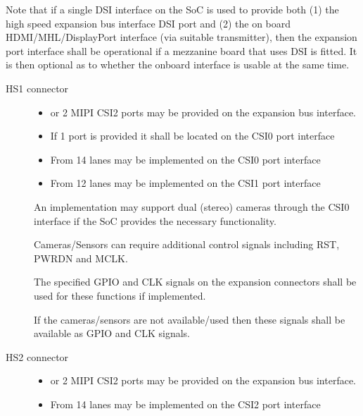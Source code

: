 \documentclass[a4paper,10pt,oneside,english]{sphinxmanual}
\begin{document}
\sphinxAtStartPar
Note that if a single DSI interface on the SoC is used to provide both (1) the high speed expansion bus interface DSI port and (2) the on board HDMI/MHL/DisplayPort interface (via suitable transmitter), then the expansion port interface shall be operational if a mezzanine board that uses DSI is fitted. It is then optional as to whether the on\sphinxhyphen{}board interface is usable at the same time.

\sphinxAtStartPar
{}
\begin{description}
\item[{HS1 connector}] \leavevmode\begin{itemize}
\item {} 
 or 2 MIPI CSI\sphinxhyphen{}2 ports may be provided on the expansion bus interface.

\item {} 
\sphinxAtStartPar
If 1 port is provided it shall be located on the CSI0 port interface

\item {} 
\sphinxAtStartPar
From 1\sphinxhyphen{}4 lanes may be implemented on the CSI0 port interface

\item {} 
\sphinxAtStartPar
From 1\sphinxhyphen{}2 lanes may be implemented on the CSI1 port interface

\end{itemize}

\sphinxAtStartPar
An implementation may support dual (stereo) cameras through the CSI0 interface if the SoC provides the necessary functionality.

\sphinxAtStartPar
Cameras/Sensors can require additional control signals including RST, PWRDN and MCLK.

\sphinxAtStartPar
The specified GPIO and CLK signals on the expansion connectors shall be used for these functions if implemented.

\sphinxAtStartPar
If the cameras/sensors are not available/used then these signals shall be available as GPIO and CLK signals.

\item[{HS2 connector}] \leavevmode\begin{itemize}
\item {} 
 or 2 MIPI CSI\sphinxhyphen{}2 ports may be provided on the expansion bus interface.

\item {} 
\sphinxAtStartPar
From 1\sphinxhyphen{}4 lanes may be implemented on the CSI2 port interface


\end{itemize}
\end{description}
\end{document}
